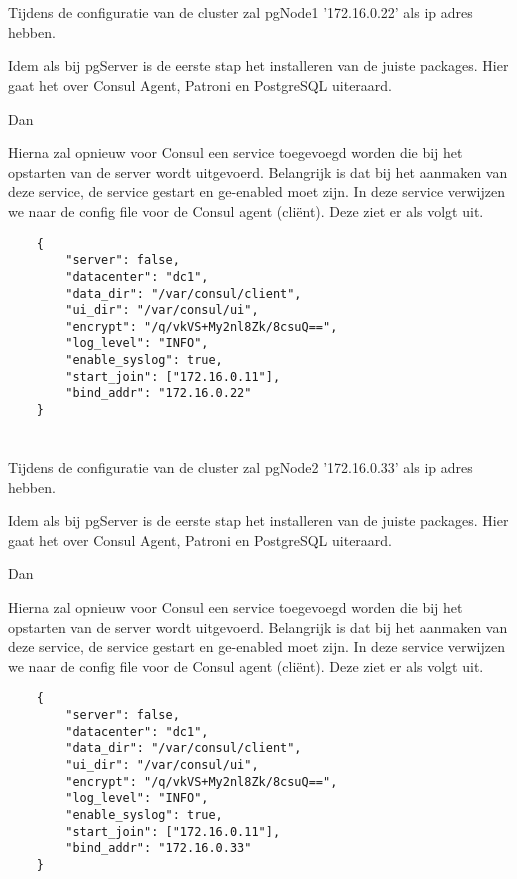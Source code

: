 \section{}
\label{sec:pgNode1}
Tijdens de configuratie van de cluster zal pgNode1 '172.16.0.22' als ip adres hebben.


Idem als bij pgServer is de eerste stap het installeren van de juiste packages. Hier gaat het over Consul Agent, Patroni en PostgreSQL uiteraard.

Dan

Hierna zal opnieuw voor Consul een service toegevoegd worden die bij het opstarten van de server wordt uitgevoerd. Belangrijk is dat bij het aanmaken van deze service, de service gestart en ge-enabled moet zijn. In deze service verwijzen we naar de config file voor de Consul agent (cliënt). Deze ziet er als volgt uit.

\begin{lstlisting}
    {
        "server": false,
        "datacenter": "dc1",
        "data_dir": "/var/consul/client",
        "ui_dir": "/var/consul/ui",
        "encrypt": "/q/vkVS+My2nl8Zk/8csuQ==", 
        "log_level": "INFO",
        "enable_syslog": true,
        "start_join": ["172.16.0.11"],
        "bind_addr": "172.16.0.22"
    }  
\end{lstlisting}


\section{}
\label{sec:pgNode2}
Tijdens de configuratie van de cluster zal pgNode2 '172.16.0.33' als ip adres hebben.

Idem als bij pgServer is de eerste stap het installeren van de juiste packages. Hier gaat het over Consul Agent, Patroni en PostgreSQL uiteraard.

Dan 

Hierna zal opnieuw voor Consul een service toegevoegd worden die bij het opstarten van de server wordt uitgevoerd. Belangrijk is dat bij het aanmaken van deze service, de service gestart en ge-enabled moet zijn. In deze service verwijzen we naar de config file voor de Consul agent (cliënt). Deze ziet er als volgt uit.

\begin{lstlisting}
    {
        "server": false,
        "datacenter": "dc1",
        "data_dir": "/var/consul/client",
        "ui_dir": "/var/consul/ui",
        "encrypt": "/q/vkVS+My2nl8Zk/8csuQ==", 
        "log_level": "INFO",
        "enable_syslog": true,
        "start_join": ["172.16.0.11"],
        "bind_addr": "172.16.0.33"
    }
\end{lstlisting}


